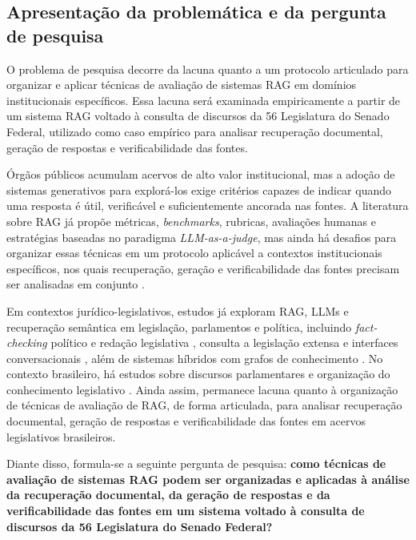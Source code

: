 \subsection{Apresentação da problemática e da pergunta de pesquisa}

O problema de pesquisa decorre da lacuna quanto a um protocolo articulado para organizar e aplicar técnicas de avaliação de sistemas RAG em domínios institucionais específicos. Essa lacuna será examinada empiricamente a partir de um sistema RAG voltado à consulta de discursos da 56\textordfeminine{} Legislatura do Senado Federal, utilizado como caso empírico para analisar recuperação documental, geração de respostas e verificabilidade das fontes.

Órgãos públicos acumulam acervos de alto valor institucional, mas a adoção de sistemas generativos para explorá-los exige critérios capazes de indicar quando uma resposta é útil, verificável e suficientemente ancorada nas fontes. A literatura sobre RAG já propõe métricas, \textit{benchmarks}, rubricas, avaliações humanas e estratégias baseadas no paradigma \textit{LLM-as-a-judge}, mas ainda há desafios para organizar essas técnicas em um protocolo aplicável a contextos institucionais específicos, nos quais recuperação, geração e verificabilidade das fontes precisam ser analisadas em conjunto \parencite{gao2023ragSurvey,esEtAl2023ragas,saadFalconEtAl2024ares,liuEtAl2025judgeRag}.

Em contextos jurídico-legislativos, estudos já exploram RAG, LLMs e recuperação semântica em legislação, parlamentos e política, incluindo \textit{fact-checking} político e redação legislativa \parencite{khaliq2024ragar,chouhanGertz2024lexdrafter}, consulta a legislação extensa e interfaces conversacionais \parencite{garrisonEtAl2024talkNdaa,rogiersEtAl2024kamerraad}, além de sistemas híbridos com grafos de conhecimento \parencite{colomboEtAl2025legisSearch,mosbachEtAl2025worldAvatarParliament}. No contexto brasileiro, há estudos sobre discursos parlamentares e organização do conhecimento legislativo \parencite{blanco2025plenarioPalanqueEstudio,blanco2026letrasGraudas,martelloteViola2025organizacaoConhecimento}. Ainda assim, permanece lacuna quanto à organização de técnicas de avaliação de RAG, de forma articulada, para analisar recuperação documental, geração de respostas e verificabilidade das fontes em acervos legislativos brasileiros.

Diante disso, formula-se a seguinte pergunta de pesquisa: \textbf{como técnicas de avaliação de sistemas RAG podem ser organizadas e aplicadas à análise da recuperação documental, da geração de respostas e da verificabilidade das fontes em um sistema voltado à consulta de discursos da 56\textordfeminine{} Legislatura do Senado Federal?}

